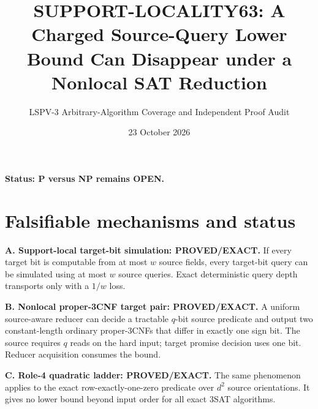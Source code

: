 \documentclass[11pt]{article}
\title{SUPPORT-LOCALITY63: A Charged Source-Query Lower Bound Can Disappear under a Nonlocal SAT Reduction}
\author{LSPV-3 Arbitrary-Algorithm Coverage and Independent Proof Audit}
\date{23 October 2026}
\begin{document}
\maketitle
\begin{center}\textbf{Status: P versus NP remains OPEN.}\end{center}

\section{Falsifiable mechanisms and status}
\noindent \textbf{A. Support-local target-bit simulation: PROVED/EXACT.} If every target bit is computable from at most \(w\) source fields, every target-bit query can be simulated using at most \(w\) source queries. Exact deterministic query depth transports only with a \(1/w\) loss.
\par\noindent \textbf{B. Nonlocal proper-3CNF target pair: PROVED/EXACT.} A uniform source-aware reducer can decide a tractable \(q\)-bit source predicate and output two constant-length ordinary proper-3CNFs that differ in exactly one sign bit. The source requires \(q\) reads on the hard input; target promise decision uses one bit. Reducer acquisition consumes the bound.
\par\noindent \textbf{C. Role-4 quadratic ladder: PROVED/EXACT.} The same phenomenon applies to the exact row-exactly-one-zero predicate over \(d^2\) source orientations. It gives no lower bound beyond input order for all exact 3SAT algorithms.
\end{document}
